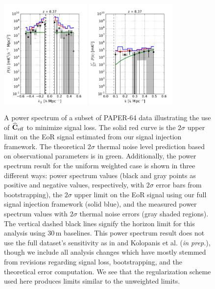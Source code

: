 \documentclass[preprint2,numberedappendix,tighten]{aastex6}  %
\begin{document}
\begin{figure}
	\centering
	\includegraphics[width=0.4\textwidth]{plots/ps1_data_add.pdf}
	\includegraphics[width=0.4\textwidth]{plots/ps2_data_add.pdf}
	\caption{A power spectrum of a subset of PAPER-64 data illustrating the use of $\widehat{\textbf{C}}_{\rm eff}$ to minimize signal loss. The solid red curve is the $2\sigma$ upper limit on the EoR signal estimated from our signal injection framework. The theoretical $2\sigma$ thermal noise level prediction based on observational parameters is in green. Additionally, the power spectrum result for the uniform weighted case is shown in three different ways: power spectrum values (black and gray points as positive and negative values, respectively, with $2\sigma$ error bars from bootstrapping), the $2\sigma$ upper limit on the EoR signal using our full signal injection framework (solid blue), and the measured power spectrum values with $2\sigma$ thermal noise errors (gray shaded regions). The vertical dashed black lines signify the horizon limit for this analysis using $30$\,m baselines. This power spectrum result does not use the full dataset's sensitivity as in  and Kolopanis et al. (\textit{in prep.}), though we include all analysis changes which have mostly stemmed from revisions regarding signal 
loss, bootstrapping, and the theoretical error computation. We see that the regularization scheme used here produces limits similar to the unweighted limits.}
	\label{fig:ps1_data}
\end{figure}
\end{document}
